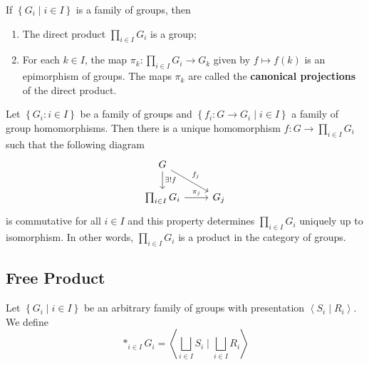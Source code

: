 \begin{proposition}
    If $\left\{G_i \mid i \in {I}\right\}$ is a family of groups, then
    \begin{enumerate}
        \item
              The direct product $\prod_{i \in I} G_i$ is a group;

        \item
              For each ${k} \in {I}$, the map $\pi_k: \prod_{i \in I} G_i \rightarrow G_k$ given by ${f} \mapsto {f}({k})$ is an epimorphism of groups.
              The maps $\pi_k$ are called the \textbf{canonical projections} of the direct product.
    \end{enumerate}
\end{proposition}


\begin{theorem}
    Let $\left\{G_i : i \in I\right\}$ be a family of groups and $\left\{f_i: G \rightarrow G_i \mid i \in I\right\}$ a family of group homomorphisms.
    Then there is a unique homomorphism $f: G \rightarrow \prod_{i \in I} G_i$ such that
    the following diagram
    \begin{equation*}
        \begin{tikzcd}
            G\arrow[d,"\exists ! f"] \arrow[rd,"f_j"] & \\
            \prod_{i \in I} G_i \arrow[r,"\pi_j"]& G_j
        \end{tikzcd}
    \end{equation*}
    is commutative
    for all $i \in {I}$ and this property determines $\prod_{i \in I} G_i$ uniquely up to isomorphism. In other words, $\prod_{i \in I} G_i$ is a product in the category of groups.
\end{theorem}

\subsection{Free Product} %
\begin{definition}
    Let $\left\{G_i \mid i \in I\right\}$ be an arbitrary family of groups with presentation $\left\langle S_i \mid R_i \right\rangle$. We define
    \begin{equation*}
        *_{i\in I} G_i
        =
        \left\langle \bigsqcup_{i\in I} S_i \mid   \bigsqcup_{i\in I} R_i \right\rangle
    \end{equation*}
\end{definition}




